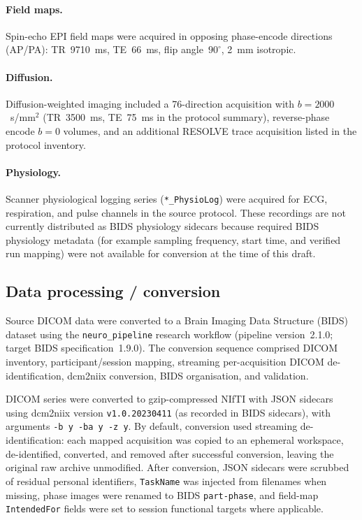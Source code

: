 \documentclass[11pt,letterpaper]{article}
\begin{document}
\paragraph{Field maps.}
Spin-echo EPI field maps were acquired in opposing phase-encode directions
(AP/PA): TR~9710~ms, TE~66~ms, flip angle~$90^\circ$, 2~mm isotropic.

\paragraph{Diffusion.}
Diffusion-weighted imaging included a 76-direction acquisition with
$b=2000$~s/mm$^2$ (TR~3500~ms, TE~75~ms in the protocol summary), reverse-phase
encode $b=0$ volumes, and an additional RESOLVE trace acquisition listed in the
protocol inventory.

\paragraph{Physiology.}
Scanner physiological logging series (\texttt{*\_PhysioLog}) were acquired for
ECG, respiration, and pulse channels in the source protocol.
These recordings are not currently distributed as BIDS physiology sidecars
because required BIDS physiology metadata (for example sampling frequency,
start time, and verified run mapping) were not available for conversion at the
time of this draft.

\subsection{Data processing / conversion}

Source DICOM data were converted to a Brain Imaging Data Structure (BIDS)
dataset using the \texttt{neuro\_pipeline} research workflow
(pipeline version~2.1.0; target BIDS specification~1.9.0).
The conversion sequence comprised DICOM inventory, participant/session mapping,
streaming per-acquisition DICOM de-identification, dcm2niix conversion, BIDS
organisation, and validation.

DICOM series were converted to gzip-compressed NIfTI with JSON sidecars using
dcm2niix version \texttt{v1.0.20230411} (as recorded in BIDS sidecars), with
arguments \texttt{-b y -ba y -z y}.
By default, conversion used streaming de-identification: each mapped acquisition
was copied to an ephemeral workspace, de-identified, converted, and removed
after successful conversion, leaving the original raw archive unmodified.
After conversion, JSON sidecars were scrubbed of residual personal identifiers,
\texttt{TaskName} was injected from filenames when missing, phase images were
renamed to BIDS \texttt{part-phase}, and field-map \texttt{IntendedFor} fields
were set to session functional targets where applicable.
\end{document}
